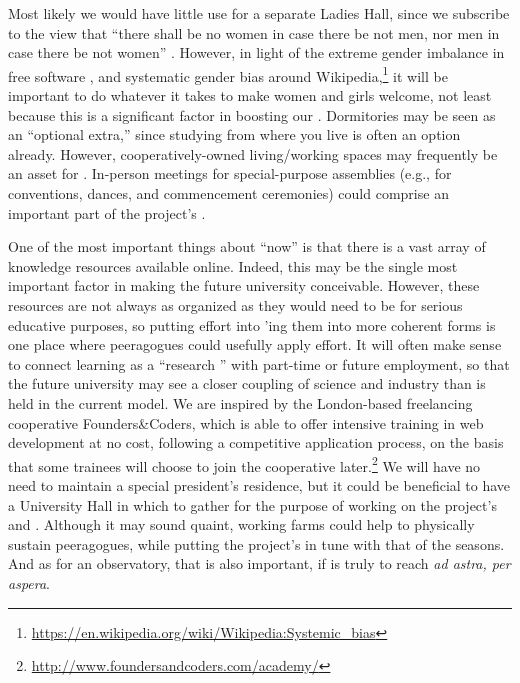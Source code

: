 Most likely we would have little use for a separate Ladies Hall, since
we subscribe to the view that ``there shall be no women in case there
be not men, nor men in case there be not women'' \cite[Chapter
  1.LII]{rabelais1894gargantua}.  However, in light of the extreme
gender imbalance in free software \cite{gender,FM4291}, and systematic
gender bias around
Wikipedia,\footnote{\url{https://en.wikipedia.org/wiki/Wikipedia:Systemic_bias}}
it will be important to do whatever it takes to make women and girls
welcome, not least because this is a significant factor in boosting
our .  Dormitories may be seen as an
``optional extra,'' since studying from where you live is often an
option already.  However, cooperatively-owned living/working spaces
may frequently be an asset for .
In-person meetings for special-purpose assemblies (e.g., for
conventions, dances, and commencement ceremonies) could comprise an
important part of the project's .

One of the most important things about ``now'' is that there is a vast
array of knowledge resources available online.  Indeed, this may be
the single most important factor in making the future university
conceivable.  However, these resources are not always as organized as
they would need to be for serious educative purposes, so putting
effort into 'ing them into more
coherent forms is one place where peeragogues could usefully apply
effort.  It will often make sense to connect learning as a ``research
'' with part-time or future employment, so that
the future university may see a closer coupling of science and
industry than is held in the current model.  We are inspired by the
London-based freelancing cooperative Founders\&Coders, which is able
to offer intensive training in web development at no cost, following a
competitive application process, on the basis that some trainees will
choose to join the cooperative
later.\footnote{\url{http://www.foundersandcoders.com/academy/}} We
will have no need to maintain a special president's residence, but it
could be beneficial to have a University Hall in which to gather for
the purpose of working on the project's  and
.  Although it may sound quaint, working farms
could help to physically sustain peeragogues, while putting the
project's  in tune with that of the seasons.
And as for an observatory, that is also important, if
 is truly to reach \emph{ad astra, per aspera}.


  
